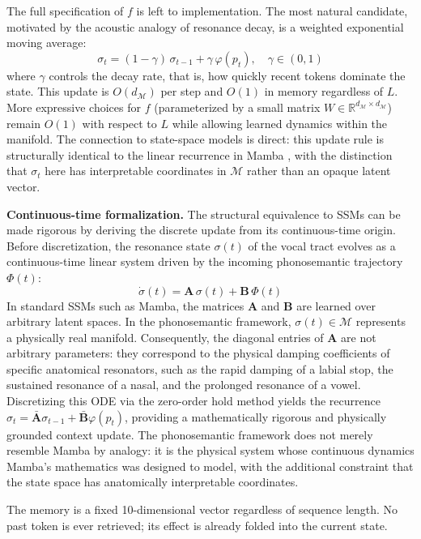 \documentclass[12pt]{article}
\begin{document}
The full specification of $f$ is left to implementation. The most natural candidate, motivated by the acoustic analogy of resonance decay, is a weighted exponential moving average:
\[
\sigma_t = (1 - \gamma)\,\sigma_{t-1} + \gamma\,\varphi(p_t), \quad \gamma \in (0,1)
\]
where $\gamma$ controls the decay rate, that is, how quickly recent tokens dominate the state. This update is $O(d_\mathcal{M})$ per step and $O(1)$ in memory regardless of $L$. More expressive choices for $f$ (parameterized by a small matrix $W \in \mathbb{R}^{d_\mathcal{M} \times d_\mathcal{M}}$) remain $O(1)$ with respect to $L$ while allowing learned dynamics within the manifold. The connection to state-space models is direct: this update rule is structurally identical to the linear recurrence in Mamba \citep{gu2022mamba}, with the distinction that $\sigma_t$ here has interpretable coordinates in $\mathcal{M}$ rather than an opaque latent vector.

\textbf{Continuous-time formalization.} The structural equivalence to SSMs can be made rigorous by deriving the discrete update from its continuous-time origin. Before discretization, the resonance state $\sigma(t)$ of the vocal tract evolves as a continuous-time linear system driven by the incoming phonosemantic trajectory $\Phi(t)$:
\[
\dot{\sigma}(t) = \mathbf{A}\,\sigma(t) + \mathbf{B}\,\Phi(t)
\]
In standard SSMs such as Mamba, the matrices $\mathbf{A}$ and $\mathbf{B}$ are learned over arbitrary latent spaces. In the phonosemantic framework, $\sigma(t) \in \mathcal{M}$ represents a physically real manifold. Consequently, the diagonal entries of $\mathbf{A}$ are not arbitrary parameters: they correspond to the physical damping coefficients of specific anatomical resonators, such as the rapid damping of a labial stop, the sustained resonance of a nasal, and the prolonged resonance of a vowel. Discretizing this ODE via the zero-order hold method yields the recurrence $\sigma_t = \bar{\mathbf{A}}\sigma_{t-1} + \bar{\mathbf{B}}\varphi(p_t)$, providing a mathematically rigorous and physically grounded context update. The phonosemantic framework does not merely resemble Mamba by analogy: it is the physical system whose continuous dynamics Mamba's mathematics was designed to model, with the additional constraint that the state space has anatomically interpretable coordinates.

The memory is a fixed 10-dimensional vector regardless of sequence length. No past token is ever retrieved; its effect is already folded into the current state.
\end{document}
